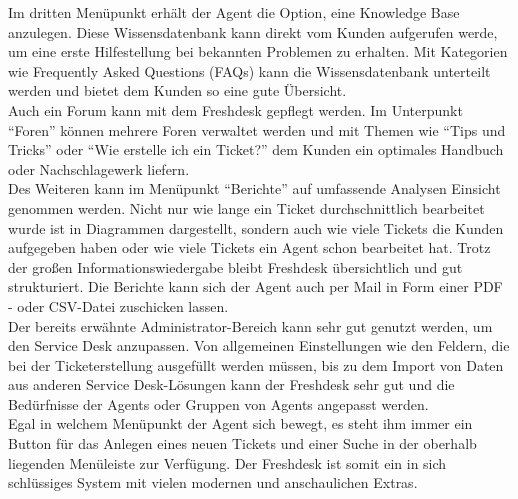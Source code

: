 Im dritten Menüpunkt erhält der Agent die Option, eine Knowledge Base anzulegen. Diese Wissensdatenbank kann direkt vom Kunden aufgerufen werde, um eine erste Hilfestellung bei bekannten Problemen zu erhalten. Mit Kategorien wie Frequently Asked Questions (FAQs) kann die Wissensdatenbank unterteilt werden und bietet dem Kunden so eine gute Übersicht.\\
Auch ein Forum kann mit dem Freshdesk gepflegt werden. Im Unterpunkt \enquote{Foren} können mehrere Foren verwaltet werden und mit Themen wie \enquote{Tips und Tricks} oder \enquote{Wie erstelle ich ein Ticket?} dem Kunden ein optimales Handbuch oder Nachschlagewerk liefern.\\
Des Weiteren kann im Menüpunkt \enquote{Berichte} auf umfassende Analysen Einsicht genommen werden. Nicht nur wie lange ein Ticket durchschnittlich bearbeitet wurde ist in Diagrammen dargestellt, sondern auch wie viele Tickets die Kunden aufgegeben haben oder wie viele Tickets ein Agent schon bearbeitet hat. Trotz der großen Informationswiedergabe bleibt Freshdesk übersichtlich und gut strukturiert. Die Berichte kann sich der Agent auch per Mail in Form einer PDF - oder CSV-Datei zuschicken lassen.\\
Der bereits erwähnte Administrator-Bereich kann sehr gut genutzt werden, um den Service Desk anzupassen. Von allgemeinen Einstellungen wie den Feldern, die bei der Ticketerstellung ausgefüllt werden müssen, bis zu dem Import von Daten aus anderen Service Desk-Lösungen kann der Freshdesk sehr gut und die Bedürfnisse der Agents oder Gruppen von Agents angepasst werden.\\
Egal in welchem Menüpunkt der Agent sich bewegt, es steht ihm immer ein Button für das Anlegen eines neuen Tickets und einer Suche in der oberhalb liegenden Menüleiste zur Verfügung. Der Freshdesk ist somit ein in sich schlüssiges System mit vielen modernen und anschaulichen Extras.\\

